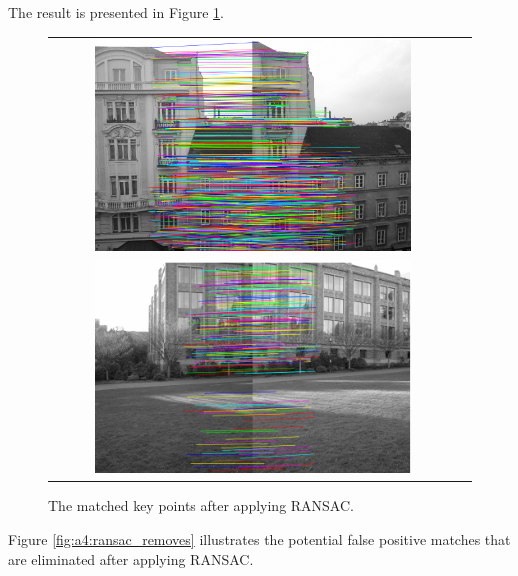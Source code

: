 The result is presented in Figure \ref{fig:a4:ransac}.

\begin{figure}[h]
	\centering
	\begin{tabular}{cc}
	\includegraphics[width=0.8\textwidth]{figures/ransac1.png} \\
	\includegraphics[width=0.8\textwidth]{figures/ransac2.png} 

	\end{tabular}
	\caption{The matched key points after applying RANSAC. }
	\label{fig:a4:ransac}
\end{figure}


Figure \ref{fig:a4:ransac_removes} illustrates the potential false positive matches that are eliminated after applying RANSAC.


